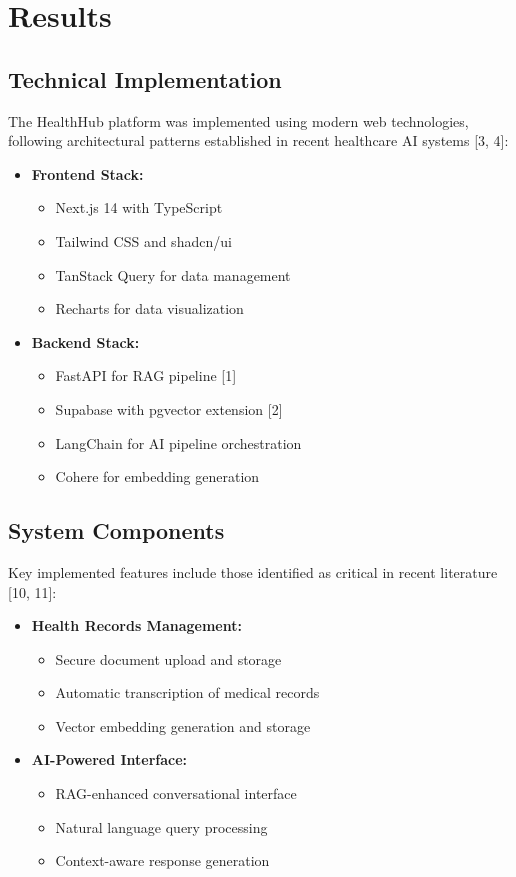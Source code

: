\section{Results}

\subsection{Technical Implementation}
The HealthHub platform was implemented using modern web technologies, following architectural patterns established in recent healthcare AI systems [3, 4]:

\begin{itemize}
\item \textbf{Frontend Stack:}
    \begin{itemize}
    \item Next.js 14 with TypeScript
    \item Tailwind CSS and shadcn/ui
    \item TanStack Query for data management
    \item Recharts for data visualization
    \end{itemize}
    
\item \textbf{Backend Stack:}
    \begin{itemize}
    \item FastAPI for RAG pipeline [1]
    \item Supabase with pgvector extension [2]
    \item LangChain for AI pipeline orchestration
    \item Cohere for embedding generation
    \end{itemize}
\end{itemize}

\subsection{System Components}
Key implemented features include those identified as critical in recent literature [10, 11]:

\begin{itemize}
\item \textbf{Health Records Management:}
    \begin{itemize}
    \item Secure document upload and storage
    \item Automatic transcription of medical records
    \item Vector embedding generation and storage
    \end{itemize}
    
\item \textbf{AI-Powered Interface:}
    \begin{itemize}
    \item RAG-enhanced conversational interface
    \item Natural language query processing
    \item Context-aware response generation
    \end{itemize}
\end{itemize}

